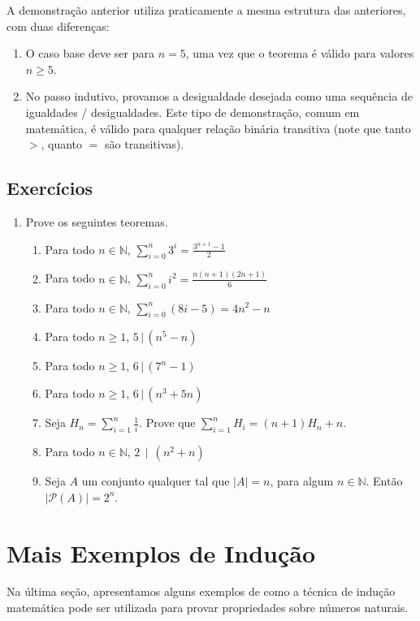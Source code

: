 \begin{Commentary}
A demonstração anterior utiliza praticamente a mesma estrutura das
anteriores, com duas diferenças:
\begin{enumerate}
  \item O caso base deve ser para $n = 5$, uma vez que o teorema é
    válido para valores $n \geq 5$.
  \item No passo indutivo, provamos a desigualdade desejada como uma
    sequência de igualdades / desigualdades. Este tipo de
    demonstração, comum em matemática, é válido para qualquer relação
    binária transitiva (note que tanto $>$, quanto $=$ são transitivas).
\end{enumerate}
\end{Commentary}

\subsection{Exercícios}

\begin{enumerate}
	\item Prove os seguintes teoremas.
	\begin{enumerate}
		\item Para todo $n\in\mathbb{N}$, $\sum_{i=0}^{n}3^i = \frac{3^{n + 1} - 1}{2}$
		\item Para todo $n\in\mathbb{N}$, $\sum_{i=0}^{n}i^{2} =
                  \frac{n(n+1)(2n + 1)}{6}$
                \item Para todo $n\in\mathbb{N}$, $\sum_{i=0}^{n}(8i - 5) =
                  4n^2 - n$
                \item Para todo $n\geq 1$, $5\,|\,(n^5-n)$
                \item Para todo $n\geq 1$, $6\,|\,(7^n-1)$
                \item Para todo $n\geq 1$, $6\,|\,(n^3+5n)$
                \item Seja $H_n = \sum_{i = 1}^n\frac{1}{i}$. Prove que
                  $\sum_{i=1}^nH_i = (n+1)H_n + n$.
		\item Para todo $n\in\mathbb{N}$, $2\,\mid\,(n^{2} + n)$
		\item Seja $A$ um conjunto qualquer tal que $|A| = n$, para algum $n\in\mathbb{N}$. Ent\~ao $|\mathcal{P}(A)| = 2^{n}$.
	\end{enumerate}
\end{enumerate}

\section{Mais Exemplos de Indução}


Na última seção, apresentamos alguns exemplos de como a técnica de
indução matemática pode ser utilizada para provar propriedades sobre
números naturais.